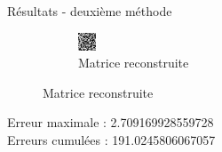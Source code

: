 \documentclass{beamer}
\begin{document}
\begin{frame}{Résultats - deuxième méthode}
\begin{figure}[t]
\begin{subfigure}[b]{0.35\textwidth}
            \includegraphics[width=\textwidth]{matReconstruction100.png}
            \caption{Matrice reconstruite}
        \end{subfigure}
    \end{figure}
Erreur maximale : 2.709169928559728\\
Erreurs cumulées : 191.0245806067057
\end{frame}
\end{document}
